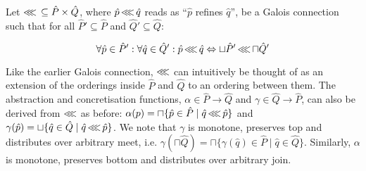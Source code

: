 






Let $\operatorname{\lll} \, \subseteq \hat P \times \hat Q$, where $\hat p \operatorname{\lll} \hat q$ reads as ``$\hat p$ refines $\hat q$'', be a Galois connection such that for all $\hat P' \subseteq \hat P$ and $\hat Q' \subseteq \hat Q$:

\begin{equation*}
\forall \hat p \in \hat P' : \forall \hat q \in \hat Q' : \hat p \operatorname{\lll} \hat q \Leftrightarrow \sqcup \hat P' \operatorname{\lll} \sqcap \hat Q'
\end{equation*}

\noindent Like the earlier Galois connection, $\operatorname{\lll}$ can intuitively be thought of as an extension of the orderings inside $\hat P$ and $\hat Q$ to an ordering between them. The abstraction and concretisation functions, $\alpha \in \hat P \rightarrow \hat Q$ and $\gamma \in \hat Q \rightarrow \hat P$, can also be derived from $\operatorname{\lll}$ as before: $\alpha(p) = \sqcap \{ \hat p \in \hat P \mid \hat q \operatorname{\lll} \hat p \}$ and $\gamma(\hat p) = \sqcup \{ \hat q \in \hat Q \mid \hat q \operatorname{\lll} \hat p \}$. We note that $\gamma$ is monotone, preserves top and distributes over arbitrary meet, i.e. $\gamma(\sqcap \hat Q) = \sqcap \{ \gamma(\hat q) \in \hat P \mid \hat q \in \hat Q\}$. Similarly, $\alpha$ is monotone, preserves bottom and distributes over arbitrary join.

